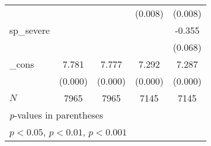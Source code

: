 {\begin{tabular}{l*{4}{c}}
            &                     &                     &     (0.008)         &     (0.008)         \\
[1em]
sp\_severe   &                     &                     &                     &      -0.355         \\
            &                     &                     &                     &     (0.068)         \\
[1em]
\_cons      &       7.781\sym{***}&       7.777\sym{***}&       7.292\sym{***}&       7.287\sym{***}\\
            &     (0.000)         &     (0.000)         &     (0.000)         &     (0.000)         \\
\hline
\(N\)       &        7965         &        7965         &        7145         &        7145         \\
\hline\hline
\multicolumn{5}{l}{\footnotesize \textit{p}-values in parentheses}\\
\multicolumn{5}{l}{\footnotesize \sym{*} \(p<0.05\), \sym{**} \(p<0.01\), \sym{***} \(p<0.001\)}\\
\end{tabular}
}
